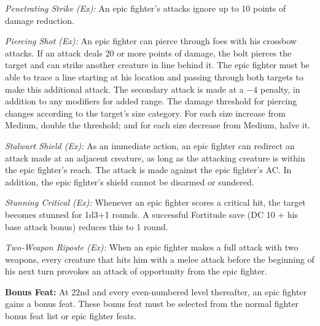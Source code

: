 \textit{Penetrating Strike (Ex):} An epic fighter's attacks ignore up to 10 points of damage reduction.

\textit{Piercing Shot (Ex):} An epic fighter can pierce through foes with his crossbow attacks. If an attack deals 20 or more points of damage, the bolt pierces the target and can strike another creature in line behind it. The epic fighter must be able to trace a line starting at his location and passing through both targets to make this additional attack. The secondary attack is made at a $-4$ penalty, in addition to any modifiers for added range. The damage threshold for piercing changes according to the target's size category. For each size increase from Medium, double the threshold; and for each size decrease from Medium, halve it.

\textit{Stalwart Shield (Ex):} As an immediate action, an epic fighter can redirect an attack made at an adjacent creature, as long as the attacking creature is within the epic fighter's reach. The attack is made against the epic fighter's AC. In addition, the epic fighter's shield cannot be disarmed or sundered.

\textit{Stunning Critical (Ex):} Whenever an epic fighter scores a critical hit, the target becomes stunned for 1d3+1 rounds. A successful Fortitude save (DC 10 + his base attack bonus) reduces this to 1 round.

\textit{Two-Weapon Riposte (Ex):} When an epic fighter makes a full attack with two weapons, every creature that hits him with a melee attack before the beginning of his next turn provokes an attack of opportunity from the epic fighter.


\textbf{Bonus Feat:} At 22nd and every even-numbered level thereafter, an epic fighter gains a bonus feat. These bonus feat must be selected from the normal fighter bonus feat list or epic fighter feats.
